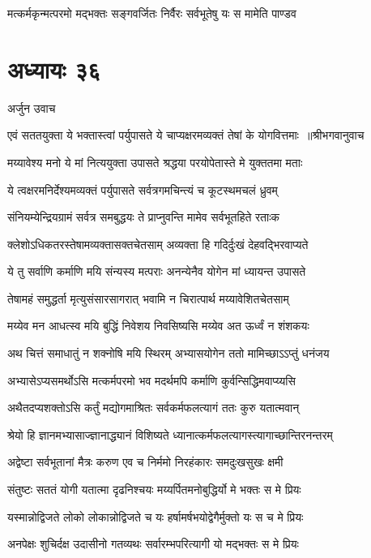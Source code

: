 \twolineshloka
{मत्कर्मकृन्मत्परमो मद्भक्तः सङ्गवर्जितः}
{निर्वैरः सर्वभूतेषु यः स मामेति पाण्डव}


\chapter{अध्यायः ३६}
\twolineshloka
{अर्जुन उवाच}
{}


\threelineshloka
{एवं सततयुक्ता ये भक्तास्त्वां पर्युपासते}
{ये चाप्यक्षरमव्यक्तं तेषां के योगवित्तमाः ॥श्रीभगवानुवाच}
{}


\twolineshloka
{मय्यावेश्य मनो ये मां नित्ययुक्ता उपासते}
{श्रद्धया परयोपेतास्ते मे युक्ततमा मताः}


\twolineshloka
{ये त्वक्षरमनिर्देश्यमव्यक्तं पर्युपासते}
{सर्वत्रगमचिन्त्यं च कूटस्थमचलं ध्रुवम्}


\twolineshloka
{संनियम्येन्द्रियग्रामं सर्वत्र समबुद्धयः}
{ते प्राप्नुवन्ति मामेव सर्वभूतहिते रताःक}


\twolineshloka
{क्लेशोऽधिकतरस्तेषामव्यक्तासक्तचेतसाम्}
{अव्यक्ता हि गदिर्दुःखं देहवद्भिरवाप्यते}


\twolineshloka
{ये तु सर्वाणि कर्माणि मयि संन्यस्य मत्पराः}
{अनन्येनैव योगेन मां ध्यायन्त उपासते}


\twolineshloka
{तेषामहं समुद्धर्ता मृत्युसंसारसागरात्}
{भवामि न चिरात्पार्थ मय्यावेशितचेतसाम्}


\twolineshloka
{मय्येव मन आधत्स्व मयि बुद्धिं निवेशय}
{निवसिष्यसि मय्येव अत ऊर्ध्वं न शंशकयः}


\twolineshloka
{अथ चित्तं समाधातुं न शक्नोषि मयि स्थिरम्}
{अभ्यासयोगेन ततो मामिच्छाऽऽप्तुं धनंजय}


\twolineshloka
{अभ्यासेऽप्यसमर्थोऽसि मत्कर्मपरमो भव}
{मदर्थमपि कर्माणि कुर्वन्सिद्धिमवाप्य्यसि}


\twolineshloka
{अथैतदप्यशक्तोऽसि कर्तुं मद्योगमाश्रितः}
{सर्वकर्मफलत्यागं ततः कुरु यतात्मवान्}


\twolineshloka
{श्रेयो हि ज्ञानमभ्यासाज्ज्ञानाद्ध्यानं विशिष्यते}
{ध्यानात्कर्मफलत्यागस्त्यागाच्छान्तिरनन्तरम्}


\twolineshloka
{अद्वेष्टा सर्वभूतानां मैत्रः करुण एव च}
{निर्ममो निरहंकारः समदुःखसुखः क्षमी}


\twolineshloka
{संतुष्टः सततं योगी यतात्मा दृढनिश्चयः}
{मय्यर्पितमनोबुद्धिर्यो मे भक्तः स मे प्रियः}


\twolineshloka
{यस्मान्नोद्विजते लोको लोकान्नोद्विजते च यः}
{हर्षामर्षभयोद्वेगैर्मुक्तो यः स च मे प्रियः}


\twolineshloka
{अनपेक्षः शुचिर्दक्ष उदासीनो गतव्यथः}
{सर्वारम्भपरित्यागी यो मद्भक्तः स मे प्रियः}


